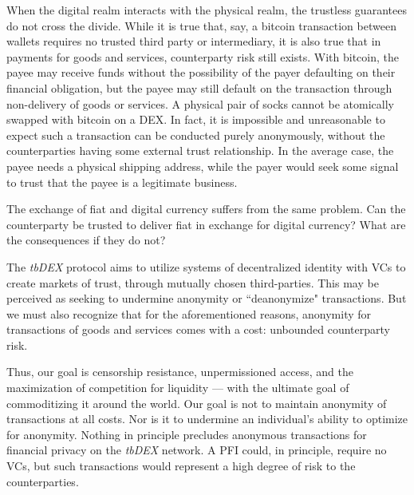 \documentclass[11pt]{article}
\begin{document}
\vspace{1\baselineskip}
When the digital realm interacts with the physical realm, the trustless guarantees do not cross the divide. While it is true that, say, a bitcoin transaction between wallets requires no trusted third party or intermediary, it is also true that in payments for goods and services, counterparty risk still exists. With bitcoin, the payee may receive funds without the possibility of the payer defaulting on their financial obligation, but the payee may still default on the transaction through non-delivery of goods or services. A physical pair of socks cannot be atomically swapped with bitcoin on a DEX. In fact, it is impossible and unreasonable to expect such a transaction can be conducted purely anonymously, without the counterparties having some external trust relationship. In the average case, the payee needs a physical shipping address, while the payer would seek some signal to trust that the payee is a legitimate business. 

\vspace{1\baselineskip}
The exchange of fiat and digital currency suffers from the same problem. Can the counterparty be trusted to deliver fiat in exchange for digital currency? What are the consequences if they do not? 

\vspace{1\baselineskip}
The \textit{tbDEX} protocol aims to utilize systems of decentralized identity with VCs to create markets of trust, through mutually chosen third-parties. This may be perceived as seeking to undermine anonymity or ``deanonymize" transactions. But we must also recognize that for the aforementioned reasons, anonymity for transactions of goods and services comes with a cost: unbounded counterparty risk. 

\vspace{1\baselineskip}
Thus, our goal is censorship resistance, unpermissioned access, and the maximization of competition for liquidity \textcolor[HTML]{202124}{— }with the ultimate goal of commoditizing it around the world. Our goal is not to maintain anonymity of transactions at all costs. Nor is it to undermine an individual’s ability to optimize for anonymity. Nothing in principle precludes anonymous transactions for financial privacy on the \textit{tbDEX} network. A PFI could, in principle, require no VCs, but such transactions would represent a high degree of risk to the counterparties. 

\vspace{1\baselineskip}
\end{document}
